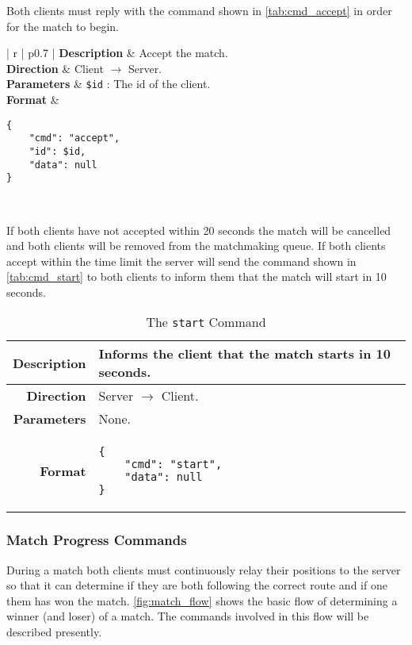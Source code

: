 Both clients must reply with the command shown in \autoref{tab:cmd_accept} in order for the match to begin.

\begin{table}[!ht]
	\centering
	\begin{tabular}{| r | p{} |}
		\hline
		\textbf{Description} & Accept the match. \\ \hline
		\textbf{Direction} & Client $\rightarrow$ Server. \\ \hline
		\textbf{Parameters} & \texttt{\$id} : The id of the client. \\ \hline
		\textbf{Format} &
\begin{lstlisting}[language=Command]
{
	"cmd": "accept",
	"id": $id,
	"data": null
}
\end{lstlisting}
		\\ \hline
	\end{tabular}
	\caption{The \texttt{accept} Command}
	\label{tab:cmd_accept}
\end{table}

If both clients have not accepted within 20 seconds the match will be cancelled and both clients will be removed from the matchmaking queue.
If both clients accept within the time limit the server will send the command shown in \autoref{tab:cmd_start} to both clients to inform them that the match will start in 10 seconds.

\begin{table}[!ht]
	\centering
	\begin{tabular}{| r | p{} |}
		\hline
		\textbf{Description} & Informs the client that the match starts in 10 seconds. \\ \hline
		\textbf{Direction} & Server $\rightarrow$ Client. \\ \hline
		\textbf{Parameters} & None. \\ \hline
		\textbf{Format} &
\begin{lstlisting}[language=Command]
{
	"cmd": "start",
	"data": null
}
\end{lstlisting}
		\\ \hline
	\end{tabular}
	\caption{The \texttt{start} Command}
	\label{tab:cmd_start}
\end{table}

\subsubsection{Match Progress Commands}
During a match both clients must continuously relay their positions to the server so that it can determine if they are both following the correct route and if one them has won the match.
\autoref{fig:match_flow} shows the basic flow of determining a winner (and loser) of a match.
The commands involved in this flow will be described presently.

